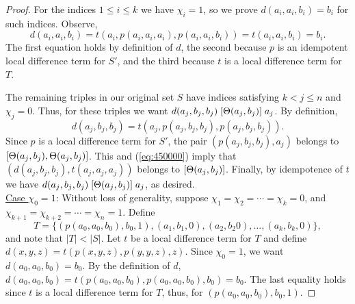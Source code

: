 \begin{proof}
For the indices $1\leq i \leq k$ we have $\chi_i =1$, so we prove
$d(a_i,a_i,b_i) = b_i$ for such indices. Observe,
\[
  d(a_i,a_i,b_i) =
  t(a_i, p(a_i,a_i,a_i), p(a_i,a_i,b_i)) %
  =t(a_i, a_i, b_i) %
  =b_i. %
\]
The first equation holds by definition of $d$, the second
because $p$ is an idempotent local difference term for
$S'$, and the third because $t$ is a local difference term for $T$.

The remaining triples in our original set $S$
have indices satisfying $k<j\leq n$ and $\chi_j = 0$.
Thus, for these triples we want
$d(a_j,b_j,b_j)\mathrel{[\Theta(a_j,b_j)]} a_j$.
By definition,
\begin{equation}
  \label{eq:450000}
d(a_j,b_j,b_j) =t(a_j, p(a_j,b_j,b_j), p(a_j,b_j,b_j)).
\end{equation}
Since $p$ is a local difference term for $S'$, %
the pair $(p(a_j,b_j,b_j), a_j)$ belongs to $[\Theta(a_j,b_j), \Theta(a_j,b_j)]$.
This and
(\ref{eq:450000}) imply
that
$(d(a_j, b_j,b_j), t(a_j,a_j,a_j))$
belongs to
$[\Theta(a_j,b_j)]$.
Finally, by idempotence of $t$ we have
$d(a_j,b_j,b_j)\mathrel{[\Theta(a_j,b_j)]} a_j$,
as desired.
\\[4pt]
\underline{Case $\chi_0 = 1$}:
Without loss of generality, suppose $\chi_1 = \chi_2 =\cdots =\chi_k = 0$,
and $\chi_{k+1} = \chi_{k+2} = \cdots = \chi_{n} = 1$. Define
\[
T = \{(p(a_0, a_0, b_0), b_0, 1),
(a_1, b_1, 0), (a_2, b_2 0), \dots, (a_k, b_k, 0)\},
\]
and note that $|T| < |S|$.
Let $t$ be a local difference term for $T$ and
define
$d(x,y,z) = t(p(x,y,z), p(y,y,z), z)$.
Since $\chi_0 =1$, we want $d(a_0,a_0,b_0) = b_0$. By the definition of
$d$,
$d(a_0,a_0,b_0) =
t(p(a_0,a_0,b_0), p(a_0,a_0,b_0), b_0) =b_0$.
The last equality holds since $t$ is a local difference term for $T$, thus,
for $(p(a_0, a_0, b_0), b_0, 1)$.


\end{proof}
